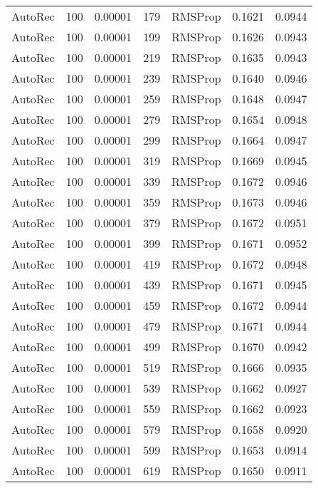 \begin{tabular}{llrllrr}
 AutoRec &  100 &  0.00001 &   179 &   RMSProp &  0.1621 &       0.0944 \\
 AutoRec &  100 &  0.00001 &   199 &   RMSProp &  0.1626 &       0.0943 \\
 AutoRec &  100 &  0.00001 &   219 &   RMSProp &  0.1635 &       0.0943 \\
 AutoRec &  100 &  0.00001 &   239 &   RMSProp &  0.1640 &       0.0946 \\
 AutoRec &  100 &  0.00001 &   259 &   RMSProp &  0.1648 &       0.0947 \\
 AutoRec &  100 &  0.00001 &   279 &   RMSProp &  0.1654 &       0.0948 \\
 AutoRec &  100 &  0.00001 &   299 &   RMSProp &  0.1664 &       0.0947 \\
 AutoRec &  100 &  0.00001 &   319 &   RMSProp &  0.1669 &       0.0945 \\
 AutoRec &  100 &  0.00001 &   339 &   RMSProp &  0.1672 &       0.0946 \\
 AutoRec &  100 &  0.00001 &   359 &   RMSProp &  0.1673 &       0.0946 \\
 AutoRec &  100 &  0.00001 &   379 &   RMSProp &  0.1672 &       0.0951 \\
 AutoRec &  100 &  0.00001 &   399 &   RMSProp &  0.1671 &       0.0952 \\
 AutoRec &  100 &  0.00001 &   419 &   RMSProp &  0.1672 &       0.0948 \\
 AutoRec &  100 &  0.00001 &   439 &   RMSProp &  0.1671 &       0.0945 \\
 AutoRec &  100 &  0.00001 &   459 &   RMSProp &  0.1672 &       0.0944 \\
 AutoRec &  100 &  0.00001 &   479 &   RMSProp &  0.1671 &       0.0944 \\
 AutoRec &  100 &  0.00001 &   499 &   RMSProp &  0.1670 &       0.0942 \\
 AutoRec &  100 &  0.00001 &   519 &   RMSProp &  0.1666 &       0.0935 \\
 AutoRec &  100 &  0.00001 &   539 &   RMSProp &  0.1662 &       0.0927 \\
 AutoRec &  100 &  0.00001 &   559 &   RMSProp &  0.1662 &       0.0923 \\
 AutoRec &  100 &  0.00001 &   579 &   RMSProp &  0.1658 &       0.0920 \\
 AutoRec &  100 &  0.00001 &   599 &   RMSProp &  0.1653 &       0.0914 \\
 AutoRec &  100 &  0.00001 &   619 &   RMSProp &  0.1650 &       0.0911 \\

\end{tabular}
